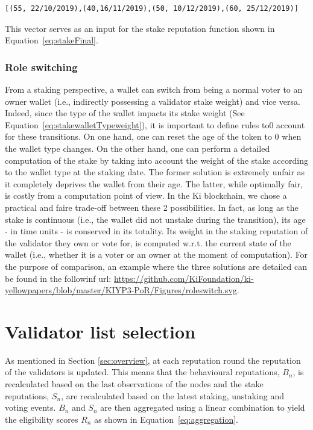 \documentclass[]{article}
\begin{document}
\begin{lstlisting}[frame=single,  basicstyle=\small]
[(55, 22/10/2019),(40,16/11/2019),(50, 10/12/2019),(60, 25/12/2019)]
\end{lstlisting}
This vector serves as an input for the stake reputation function shown in Equation~\ref{eq:stakeFinal}.

\subsubsection{Role switching}
From a staking perspective, a wallet can switch from being a normal voter to an owner wallet (i.e., indirectly possessing a validator stake weight) and vice versa. Indeed, since the type of the wallet impacts its stake weight (See Equation~\ref{eq:stakewalletTypeweight}), it is important to define rules to0 account for these transitions. On one hand, one can reset the age of the token to 0 when the wallet type changes. On the other hand, one can perform a detailed computation of the stake by taking into account the weight of the stake according to the wallet type at the staking date. The former solution is extremely unfair as it completely deprives the wallet from their age. The latter, while optimally fair, is costly from a computation point of view. In the Ki blockchain, we chose a practical and faire trade-off between these 2 possibilities. In fact, as long as the stake is continuous (i.e., the wallet did not unstake during the transition), its age - in time units - is conserved in its totality. Its weight in the  staking reputation of the validator they own or vote for, is computed w.r.t. the current state of the wallet (i.e., whether it is a voter or an owner at the moment of computation). For the purpose of comparison, an example where the three solutions are detailed can be found in the followinf url: \url{https://github.com/KiFoundation/ki-yellowpapers/blob/master/KIYP3-PoR/Figures/roleswitch.svg}.

\section{Validator list selection}
As mentioned in Section \ref{sec:overview}, at each reputation round the reputation of the validators is updated. This means that the behavioural reputations, $B_n$, is recalculated based on the last observations of the nodes and the stake reputations, $S_n$, are recalculated based on the latest staking, unstaking and voting events. $B_n$ and $S_n$ are then aggregated using a linear combination to yield the eligibility scores $R_n$ as shown in Equation~\ref{eq:aggregation}. 
\end{document}
